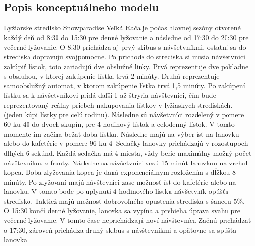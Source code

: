 \subsection{Popis konceptuálneho modelu}
Lyžiarske stredisko Snowparadise Veľká Rača je počas hlavnej sezóny otvorené každý deň od 8:30 do 15:30 pre denné lyžovanie a následne 
od 17:30 do 20:30 pre večerné lyžovanie. O 8:30 prichádza aj prvý skibus s návšetvníkmi, ostatní sa do strediska dopravujú svojpomocne. Po príchode do strediska si musia návšetvníci zakúpiť lístok, toto zariadujú dve obslužné linky. 
Prvá reprezentuje dve pokladne s obsluhou,
v ktorej zakúpenie lístka trvá 2 minúty. Druhá reprezentuje samoobslužný automat, v ktorom zakúpenie lístka trvá 1,5 minúty.
Po zakúpení lístku sa k návšetvníkovi pridá ďaľší 1 až štryria návštevníci, čím bude reprezentovaný reálny priebeh nakupovania lístkov v lyžiaskych strediskách.
(jeden kúpi lístky pre celú rodinu). Následne sú návšetvníci rozdelený v pomere 60 ku 40 do dvoch skupín, pre 4 hodinový lístok a celodenný lístok.
V tomto momente im začína bežať doba lístku. Následne majú na výber ísť na lanovku alebo do kafetérie v pomere 96 ku 4. Sedačky lanovky 
prichádzajú v rozostupoch dlhých 6 sekúnd. Každá sedačka má 4 miesta, vždy berie maximálny možný počet návštevníkov z fronty. Následne
sa návšetvníci vezú 15 minút lanovkou na vrchol kopca. Doba zlyžovania kopca je daná exponenciálnym rozložením s dĺžkou 8 minúty.
Po zlyžovaní majú návštevníci zase možnosť ísť do kafetérie alebo na lanovku. V tomto bode po uplynutí 4 hodinového lístku návšetvník opúšťa stredisko. Taktiež majú možnosť dobrovoľného opustenia strediska s šancou 5\%.
O 15:30 končí denné lyžovanie, lanovka sa vypína a prebieha úprava svahu pre večerné lyžovanie. V tomto čase neprichádzajú noví návštevníci.
Začnú prichádzať o 17:30, zároveň prichádza druhý skibus s návštevníkmi a opätovne sa spúšťa lanovka. 
